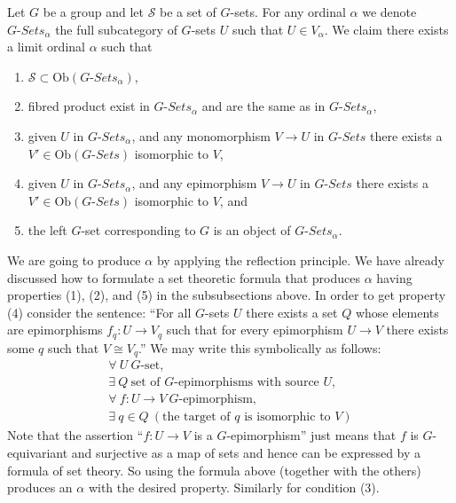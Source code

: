 \noindent
Let $G$ be a group and let $\mathcal{S}$ be a 
set of $G$-sets. For any ordinal $\alpha$ we denote
$G\textit{-Sets}_\alpha$ the full subcategory of $G$-sets
$U$ such that $U \in V_\alpha$. We claim there exists a limit
ordinal $\alpha$ such that
\begin{enumerate}
\item $\mathcal{S} \subset \text{Ob}(G\textit{-Sets}_\alpha)$,
\item fibred product exist in $G\textit{-Sets}_\alpha$
and are the same as in $G\textit{-Sets}_\alpha$,
\item given $U$ in $G\textit{-Sets}_\alpha$, and any monomorphism
$V \to U$ in $G\textit{-Sets}$ there exists a
$V' \in \text{Ob}(G\textit{-Sets})$ isomorphic to $V$,
\item given $U$ in $G\textit{-Sets}_\alpha$, and any epimorphism
$V \to U$ in $G\textit{-Sets}$ there exists a
$V' \in \text{Ob}(G\textit{-Sets})$ isomorphic to $V$, and
\item the left $G$-set corresponding to $G$ is an object of
$G\textit{-Sets}_\alpha$.
\end{enumerate}
We are going to produce $\alpha$ by applying the reflection
principle. We have already discussed how to formulate a set
theoretic formula that produces $\alpha$ having properties
(1), (2), and (5) in the subsubsections above. In order to 
get property (4) consider the sentence: ``For all $G$-sets
$U$ there exists a set $Q$ whose elements are epimorphisms
$f_q : U \to V_q$ such that for every epimorphism $U \to V$
there exists some $q$ such that $V \cong V_q$.'' We may write
this symbolically as follows:
\begin{eqnarray*}
\forall\ U\ \text{$G$-set},\\
\exists\ Q\ \text{set of $G$-epimorphisms with source $U$},\\
\forall\ f : U\to V\ \text{$G$-epimorphism},\\
\exists\ q \in Q\ (\text{the target of $q$ is isomorphic to $V$})
\end{eqnarray*}
Note that the assertion ``$f : U \to V$ is a $G$-epimorphism'' just
means that $f$ is $G$-equivariant and surjective as a map of sets
and hence can be expressed by a formula of set theory. So using
the formula above (together with the others) produces an $\alpha$
with the desired property. Similarly for condition (3).







